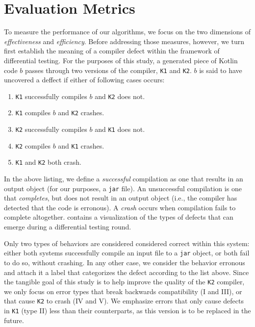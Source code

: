\section{\label{sec:metrics}Evaluation Metrics}

To measure the performance of our algorithms, we focus on the two
dimensions of \textit{effectiveness} and \textit{efficiency}.
Before addressing those measures, however, we turn first establish
the meaning of a compiler defect within the framework
of differential testing.
For the purposes of this study, a generated piece of Kotlin code
$b$ passes through two versions of the compiler,
\texttt{K1} and \texttt{K2}.
$b$ is said to have uncovered a deffect if either of following cases occurs:

\begin{enumerate}
    \item \texttt{K1} successfully compiles $b$ and \texttt{K2} does not.
    \item \texttt{K1} compiles $b$ and \texttt{K2} crashes.
    \item \texttt{K2} successfully compiles $b$ and \texttt{K1} does not.
    \item \texttt{K2} compiles $b$ and \texttt{K1} crashes.
    \item \texttt{K1} and \texttt{K2} both crash.
\end{enumerate}

In the above listing, we define a \textit{successful} compilation
as one that results in an output object
(for our purposes, a \texttt{jar} file).
An unsuccessful compilation is one that \textit{completes}, but
does not result in an output object (i.e., the compiler
has detected that the code is erronous).
A \textit{crash} occurs when compilation fails to complete altogether.
 contains a visualization of the types of defects
that can emerge during a differential testing round.

Only two types of behaviors are considered considered correct within
this system: either both systems successfully compile an input
file to a \texttt{jar} object, or both fail to do so, without crashing.
In any other case, we consider the behavior erronous and attach it a 
label that categorizes the defect according to the list above.
Since the tangible goal of this study is to help improve
the quality of the \texttt{K2} compiler, we only focus on error types
that break backwards compatibility (I and III), or that cause \texttt{K2}
to crash (IV and V).
We emphasize errors that only cause defects in \texttt{K1} (type II)
less than their counterparts, as this version is to be replaced in the future.

